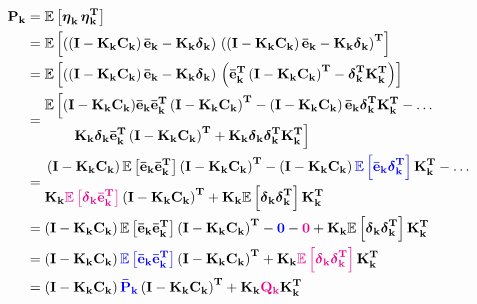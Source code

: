 \documentclass[12pt]{article}
\begin{document}
\begin{equation}
    \begin{aligned}
        \mat{P_k} &= \expv{\mb{\eta}_\mathbf{k}\,\mb{\eta}_\mathbf{k}^\mathbf{T}}\\
        &= \expv{\parentheses{\parentheses{\mat{I} - \mat{K_k}\mat{C_k}} \bvec{\bar{e}_k} - \mat{K_k}\mb{\delta}_\mathbf{k}}\, \parentheses{\parentheses{\mat{I} - \mat{K_k}\mat{C_k}} \bvec{\bar{e}_k} - \mat{K_k}\mb{\delta}_\mathbf{k}}^\mathbf{T}}\\
        &= \expv{\parentheses{\parentheses{\mat{I} - \mat{K_k}\mat{C_k}} \bvec{\bar{e}_k} - \mat{K_k}\mb{\delta}_\mathbf{k}}\, \parentheses{\bvecT{\bar{e}_k} \parentheses{\mat{I} - \mat{K_k}\mat{C_k}}^\mathbf{T}  - \mb{\delta}_\mathbf{k}^\mathbf{T}\matT{K_k}}}\\
        &= \begin{aligned}
        \mathbb{E}\,\Big[(\mat{I}& - \mat{K_k}\mat{C_k}) \bvec{\bar{e}_k} \bvecT{\bar{e}_k} \parentheses{\mat{I} - \mat{K_k}\mat{C_k}}^\mathbf{T} - \parentheses{\mat{I} - \mat{K_k}\mat{C_k}} \bvec{\bar{e}_k}\mb{\delta}_\mathbf{k}^\mathbf{T}\matT{K_k} - \dots \\ &\mat{K_k}\mb{\delta}_\mathbf{k}\bvecT{\bar{e}_k} \parentheses{\mat{I} - \mat{K_k}\mat{C_k}}^\mathbf{T} + \mat{K_k}\mb{\delta}_\mathbf{k}\mb{\delta}_\mathbf{k}^\mathbf{T}\matT{K_k}\Big]
        \end{aligned}\\
        &= \begin{aligned}
        &\parentheses{\mat{I} - \mat{K_k}\mat{C_k}} \expv{\bvec{\bar{e}_k} \bvecT{\bar{e}_k}} \parentheses{\mat{I} - \mat{K_k}\mat{C_k}}^\mathbf{T} - \parentheses{\mat{I} - \mat{K_k}\mat{C_k}} \blue{\expv{\bvec{\bar{e}_k}\mb{\delta}_\mathbf{k}^\mathbf{T}}}\matT{K_k} - \dots \\ &\mat{K_k} \magenta{\expv{\mb{\delta}_\mathbf{k}\bvecT{\bar{e}_k}}} \parentheses{\mat{I} - \mat{K_k}\mat{C_k}}^\mathbf{T} + \mat{K_k}\expv{\mb{\delta}_\mathbf{k}\mb{\delta}_\mathbf{k}^\mathbf{T}}\matT{K_k}
        \end{aligned}\\
        &=\parentheses{\mat{I} - \mat{K_k}\mat{C_k}} \expv{\bvec{\bar{e}_k} \bvecT{\bar{e}_k}} \parentheses{\mat{I} - \mat{K_k}\mat{C_k}}^\mathbf{T} - \blue{\mat{0}} - \magenta{\mat{0}} + \mat{K_k}\expv{\mb{\delta}_\mathbf{k}\mb{\delta}_\mathbf{k}^\mathbf{T}}\matT{K_k}\\
        &=\parentheses{\mat{I} - \mat{K_k}\mat{C_k}} \blue{\expv{\bvec{\bar{e}_k} \bvecT{\bar{e}_k}}} \parentheses{\mat{I} - \mat{K_k}\mat{C_k}}^\mathbf{T} + \mat{K_k}\magenta{\expv{\mb{\delta}_\mathbf{k}\mb{\delta}_\mathbf{k}^\mathbf{T}}}\matT{K_k}\\
        &=\parentheses{\mat{I} - \mat{K_k}\mat{C_k}} \blue{\mat{\bar{P}_k}} \parentheses{\mat{I} - \mat{K_k}\mat{C_k}}^\mathbf{T} + \mat{K_k}\magenta{\mat{Q_k}}\matT{K_k}
    \end{aligned}
    \label{eq:kf-estimate-covariance}
\end{equation}
\end{document}
